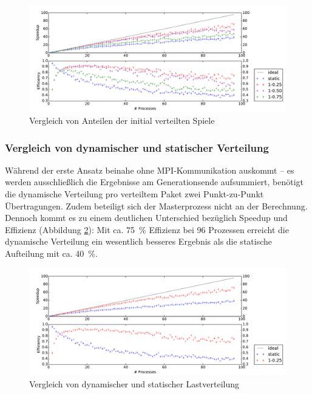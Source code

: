 \begin{figure}
    \centering
    \includegraphics[width=\textwidth]
        {content/img/strong_scaling_time_initial.pdf}
    \caption{Vergleich von Anteilen der initial verteilten Spiele}
    \label{fig:speedup_initial}
\end{figure}

\subsubsection{Vergleich von dynamischer und statischer Verteilung}
Während der erste Ansatz beinahe ohne MPI-Kommunikation auskommt -- es werden
ausschließlich die Ergebnisse am Generationsende aufsummiert, benötigt die
dynamische Verteilung pro verteiltem Paket zwei Punkt-zu-Punkt Übertragungen.
Zudem beteiligt sich der Masterprozess nicht an der Berechnung.  Dennoch kommt
es zu einem deutlichen Unterschied bezüglich Speedup und Effizienz (Abbildung
\ref{fig:speedup_final}): Mit ca. \SI{75}{\percent} Effizienz bei 96 Prozessen
erreicht die dynamische Verteilung ein wesentlich besseres Ergebnis als die
statische Aufteilung mit ca. \SI{40}{\percent}.

\begin{figure}
    \centering
    \includegraphics[width=\textwidth]
        {content/img/strong_scaling_time_final.pdf}
    \caption{Vergleich von dynamischer und statischer Lastverteilung}
    \label{fig:speedup_final}
\end{figure}

